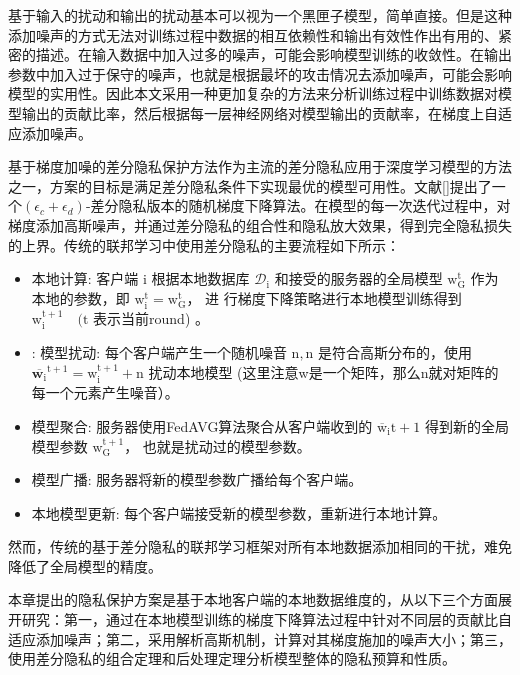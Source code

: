 基于输入的扰动和输出的扰动基本可以视为一个黑匣子模型，简单直接。但是这种添加噪声的方式无法对训练过程中数据的相互依赖性和输出有效性作出有用的、紧密的描述。在输入数据中加入过多的噪声，可能会影响模型训练的收敛性。在输出参数中加入过于保守的噪声，也就是根据最坏的攻击情况去添加噪声，可能会影响模型的实用性。因此本文采用一种更加复杂的方法来分析训练过程中训练数据对模型输出的贡献比率，然后根据每一层神经网络对模型输出的贡献率，在梯度上自适应添加噪声。

基于梯度加噪的差分隐私保护方法作为主流的差分隐私应用于深度学习模型的方法之一，方案的目标是满足差分隐私条件下实现最优的模型可用性。文献[]提出了一个$\left(\epsilon_{c}+\epsilon_{d}\right)$-差分隐私版本的随机梯度下降算法。在模型的每一次迭代过程中，对梯度添加高斯噪声，并通过差分隐私的组合性和隐私放大效果，得到完全隐私损失的上界。传统的联邦学习中使用差分隐私的主要流程如下所示：
\begin{itemize}
\item 本地计算:
客户端 $\mathrm{i}$ 根据本地数据库 $\mathcal{D}_{\mathrm{i}}$ 和接受的服务器的全局模型 $\mathrm{w}_{\mathrm{G}}^{\mathrm{t}}$ 作为本地的参数，即 $\mathrm{w}_{\mathrm{i}}^{\mathrm{t}}=\mathrm{w}_{\mathrm{G}}^{\mathrm{t}}$， 进 行梯度下降策略进行本地模型训练得到 $\mathrm{w}_{\mathrm{i}}^{\mathrm{t}+1} \quad(\mathrm{t}$ 表示当前round) 。

\item: 模型扰动:
每个客户端产生一个随机噪音 $\mathrm{n},\mathrm{n}$ 是符合高斯分布的，使用 $\overline{\mathbf{w}_{\mathrm{i}}}^{\mathrm{t}+1}=\mathrm{w}_{\mathrm{i}}^{\mathrm{t}+1}+\mathrm{n}$ 扰动本地模型 (这里注意w是一个矩阵，那么n就对矩阵的每一个元素产生噪音）。

\item 模型聚合:
服务器使用FedAVG算法聚合从客户端收到的 $\overline{\mathrm{w}}_{\mathrm{i}} \mathrm{t}+1$ 得到新的全局模型参数 $\mathrm{w}_{\mathrm{G}}^{\mathrm{t}+1}$， 也就是扰动过的模型参数。

\item 模型广播:
服务器将新的模型参数广播给每个客户端。

\item 本地模型更新:
每个客户端接受新的模型参数，重新进行本地计算。
\end{itemize}

然而，传统的基于差分隐私的联邦学习框架对所有本地数据添加相同的干扰，难免降低了全局模型的精度。

本章提出的隐私保护方案是基于本地客户端的本地数据维度的，从以下三个方面展开研究：第一，通过在本地模型训练的梯度下降算法过程中针对不同层的贡献比自适应添加噪声；第二，采用解析高斯机制，计算对其梯度施加的噪声大小；第三，使用差分隐私的组合定理和后处理定理分析模型整体的隐私预算和性质。

